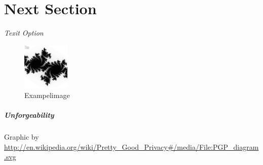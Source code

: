 \section{Next Section}
\label{section:Label}

\textit{Texit Option}

\begin{figure}[h!]
  \centering
      \includegraphics[width=0.2\textwidth]{images/Julia-Fractal.png}
  \caption{Exampelimage}
\end{figure}

\subparagraph{Unforgeability}
\label{subp:subparagraph_name}

Graphic by \url{http://en.wikipedia.org/wiki/Pretty_Good_Privacy#/media/File:PGP_diagram.svg}
